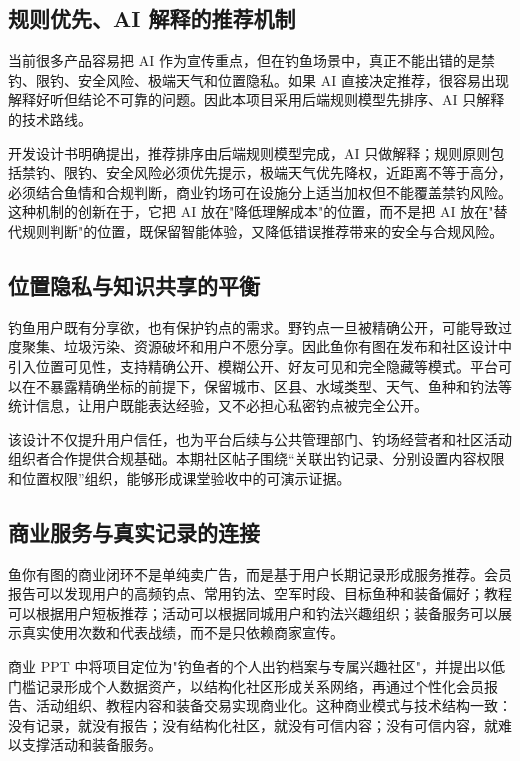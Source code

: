 \subsection{规则优先、AI 解释的推荐机制}

当前很多产品容易把 AI 作为宣传重点，但在钓鱼场景中，真正不能出错的是禁钓、限钓、安全风险、极端天气和位置隐私。如果 AI 直接决定推荐，很容易出现解释好听但结论不可靠的问题。因此本项目采用后端规则模型先排序、AI 只解释的技术路线。

开发设计书明确提出，推荐排序由后端规则模型完成，AI 只做解释；规则原则包括禁钓、限钓、安全风险必须优先提示，极端天气优先降权，近距离不等于高分，必须结合鱼情和合规判断，商业钓场可在设施分上适当加权但不能覆盖禁钓风险。这种机制的创新在于，它把 AI 放在"降低理解成本"的位置，而不是把 AI 放在"替代规则判断"的位置，既保留智能体验，又降低错误推荐带来的安全与合规风险。

\subsection{位置隐私与知识共享的平衡}

钓鱼用户既有分享欲，也有保护钓点的需求。野钓点一旦被精确公开，可能导致过度聚集、垃圾污染、资源破坏和用户不愿分享。因此鱼你有图在发布和社区设计中引入位置可见性，支持精确公开、模糊公开、好友可见和完全隐藏等模式。平台可以在不暴露精确坐标的前提下，保留城市、区县、水域类型、天气、鱼种和钓法等统计信息，让用户既能表达经验，又不必担心私密钓点被完全公开。

该设计不仅提升用户信任，也为平台后续与公共管理部门、钓场经营者和社区活动组织者合作提供合规基础。本期社区帖子围绕“关联出钓记录、分别设置内容权限和位置权限”组织，能够形成课堂验收中的可演示证据。

\subsection{商业服务与真实记录的连接}

鱼你有图的商业闭环不是单纯卖广告，而是基于用户长期记录形成服务推荐。会员报告可以发现用户的高频钓点、常用钓法、空军时段、目标鱼种和装备偏好；教程可以根据用户短板推荐；活动可以根据同城用户和钓法兴趣组织；装备服务可以展示真实使用次数和代表战绩，而不是只依赖商家宣传。

商业 PPT 中将项目定位为"钓鱼者的个人出钓档案与专属兴趣社区"，并提出以低门槛记录形成个人数据资产，以结构化社区形成关系网络，再通过个性化会员报告、活动组织、教程内容和装备交易实现商业化。这种商业模式与技术结构一致：没有记录，就没有报告；没有结构化社区，就没有可信内容；没有可信内容，就难以支撑活动和装备服务。

